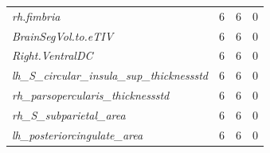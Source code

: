 \documentclass{article}
\begin{document}
\begin{table}[h]
\begin{tabular}{llll}
\textit{rh.fimbria}                                 & 6             & 6             & 0             \\
\textit{BrainSegVol.to.eTIV}                        & 6             & 6             & 0             \\
\textit{Right.VentralDC}                            & 6             & 6             & 0             \\
\textit{lh\_S\_circular\_insula\_sup\_thicknessstd} & 6             & 6             & 0             \\
\textit{rh\_parsopercularis\_thicknessstd}          & 6             & 6             & 0             \\
\textit{rh\_S\_subparietal\_area}                   & 6             & 6             & 0             \\
\textit{lh\_posteriorcingulate\_area}               & 6             & 6             & 0
\end{tabular}
\end{table}

\newpage
\end{document}
